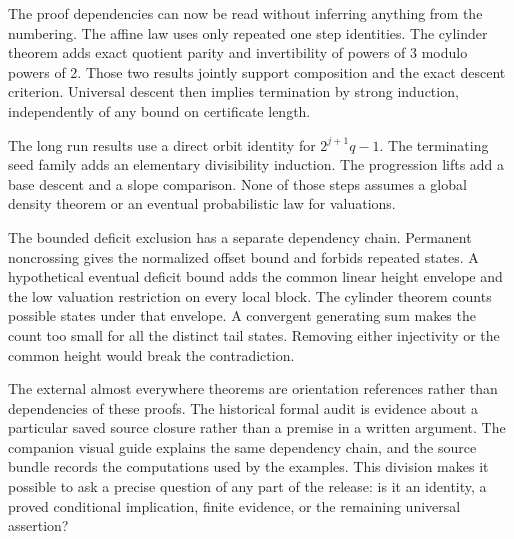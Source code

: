 The proof dependencies can now be read without inferring anything from the numbering. The affine law uses only repeated one step identities. The cylinder theorem adds exact quotient parity and invertibility of powers of 3 modulo powers of 2. Those two results jointly support composition and the exact descent criterion. Universal descent then implies termination by strong induction, independently of any bound on certificate length.

The long run results use a direct orbit identity for $2^{j+1}q-1$. The terminating seed family adds an elementary divisibility induction. The progression lifts add a base descent and a slope comparison. None of those steps assumes a global density theorem or an eventual probabilistic law for valuations.

The bounded deficit exclusion has a separate dependency chain. Permanent noncrossing gives the normalized offset bound and forbids repeated states. A hypothetical eventual deficit bound adds the common linear height envelope and the low valuation restriction on every local block. The cylinder theorem counts possible states under that envelope. A convergent generating sum makes the count too small for all the distinct tail states. Removing either injectivity or the common height would break the contradiction.

The external almost everywhere theorems are orientation references rather than dependencies of these proofs. The historical formal audit is evidence about a particular saved source closure rather than a premise in a written argument. The companion visual guide explains the same dependency chain, and the source bundle records the computations used by the examples. This division makes it possible to ask a precise question of any part of the release: is it an identity, a proved conditional implication, finite evidence, or the remaining universal assertion?
